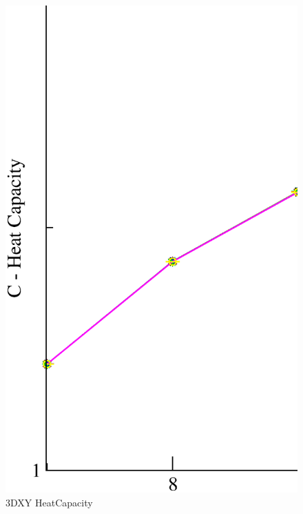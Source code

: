 \begin{figure}[!htpb]
  \centering
  \includegraphics[width=\textwidth]{./plots/3DXY/vsL/HeatCapacity.eps}
  \caption{3DXY HeatCapacity}
\end{figure}


